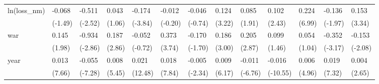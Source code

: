 \begin{tabular}{p{1.5cm} p{1.7cm} p{1.7cm} p{1.7cm} p{1.7cm} p{1.7cm} p{1.7cm} p{1.7cm} p{1.7cm} p{1.7cm} p{1.7cm} p{1.7cm} p{1.7cm}}
\hline
ln(loss\_nm)     &   -0.068         &   -0.511\sym{*}  &    0.043         &   -0.174\sym{***}&   -0.012         &   -0.046         &    0.124\sym{**} &    0.085         &    0.102\sym{*}  &    0.224\sym{***}&   -0.136         &    0.153\sym{**} \\
                &  (-1.49)         &  (-2.52)         &   (1.06)         &  (-3.84)         &  (-0.20)         &  (-0.74)         &   (3.22)         &   (1.91)         &   (2.43)         &   (6.99)         &  (-1.97)         &   (3.34)         \\
war             &    0.145         &   -0.934\sym{**} &    0.187\sym{**} &   -0.052         &    0.373\sym{***}&   -0.170         &    0.186\sym{**} &    0.205\sym{**} &    0.099         &    0.054         &   -0.352\sym{**} &   -0.153\sym{*}  \\
                &   (1.98)         &  (-2.86)         &   (2.86)         &  (-0.72)         &   (3.74)         &  (-1.70)         &   (3.00)         &   (2.87)         &   (1.46)         &   (1.04)         &  (-3.17)         &  (-2.08)         \\
year            &    0.013\sym{***}&   -0.055\sym{***}&    0.008\sym{***}&    0.021\sym{***}&    0.018\sym{***}&   -0.005\sym{*}  &    0.009\sym{***}&   -0.011\sym{***}&   -0.016\sym{***}&    0.006\sym{***}&    0.019\sym{***}&    0.004\sym{*}  \\
                &   (7.66)         &  (-7.28)         &   (5.45)         &  (12.48)         &   (7.84)         &  (-2.34)         &   (6.17)         &  (-6.76)         & (-10.55)         &   (4.96)         &   (7.32)         &   (2.65)         \\
\end{tabular}
